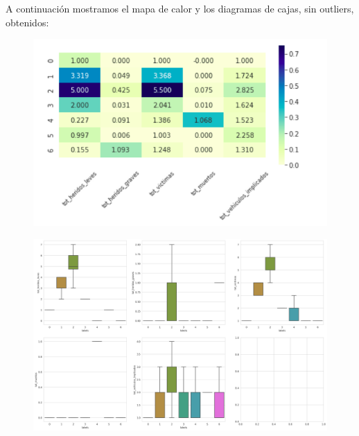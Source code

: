 \documentclass[a4paper,11pt]{book}
\begin{document}
A continuación mostramos el mapa de calor y los diagramas de cajas, sin outliers, obtenidos:
\vspace{6cm}
\begin{figure}[H]
	\centering
	\includegraphics[width=0.9\linewidth]{img/heatmap2}
	\caption{}
	\label{fig:heatmap2}
\end{figure}
\begin{figure}[H]
	\centering
	\includegraphics[width=1.1\linewidth]{img/cajas_cluster2}
	\caption{}
	\label{fig:cajascluster2}
\end{figure}
\end{document}
